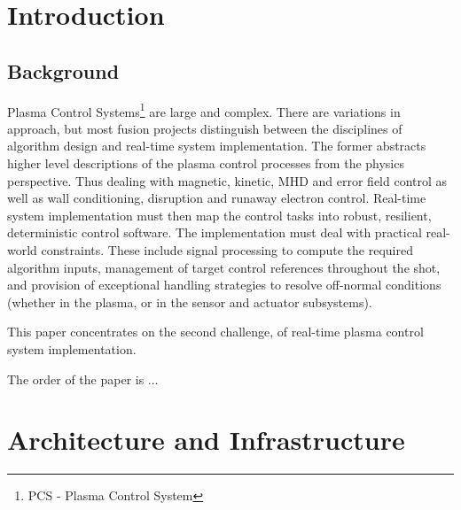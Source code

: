 \documentclass[preprint,12pt]{elsarticle}
\begin{document}

\section{Introduction}
\label{sec:intro}

\subsection{Background}

Plasma Control Systems\footnote{PCS - Plasma Control System} are large and complex.
There are variations in approach, but most fusion projects distinguish between
the disciplines of algorithm design and real-time system implementation.
The former abstracts higher level descriptions of the plasma control processes
from the physics perspective. Thus dealing with magnetic, kinetic, MHD and error field
control as well as wall conditioning, disruption and runaway electron control.
Real-time system implementation must then map the control tasks into robust, resilient,
deterministic control software. The implementation must deal with practical real-world
constraints. These include signal processing to compute the required algorithm
inputs, management of target control references throughout the shot, and provision 
of exceptional handling strategies to resolve off-normal conditions (whether in the plasma,
or in the sensor and actuator subsystems).

%
%

This paper concentrates on the second challenge, of real-time plasma control system implementation.

The order of the paper is $\ldots$ %



\section{Architecture and Infrastructure}
\end{document}
